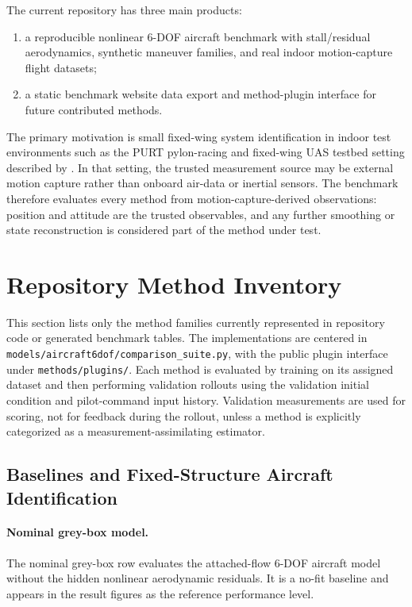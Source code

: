 \documentclass[11pt]{article}
\begin{document}
The current repository has three main products:
\begin{enumerate}
    \item a reproducible nonlinear 6-DOF aircraft benchmark with stall/residual aerodynamics, synthetic maneuver families, and real indoor motion-capture flight datasets;
    \item a static benchmark website data export and method-plugin interface for future contributed methods.
\end{enumerate}

The primary motivation is small fixed-wing system identification in indoor test environments such as the PURT pylon-racing and fixed-wing UAS testbed setting described by \citet{sribunma2026indoor}. In that setting, the trusted measurement source may be external motion capture rather than onboard air-data or inertial sensors. The benchmark therefore evaluates every method from motion-capture-derived observations: position and attitude are the trusted observables, and any further smoothing or state reconstruction is considered part of the method under test.

\section{Repository Method Inventory}

This section lists only the method families currently represented in repository code or generated benchmark tables. The implementations are centered in \texttt{models/aircraft6dof/comparison\_suite.py}, with the public plugin interface under \texttt{methods/plugins/}. Each method is evaluated by training on its assigned dataset and then performing validation rollouts using the validation initial condition and pilot-command input history. Validation measurements are used for scoring, not for feedback during the rollout, unless a method is explicitly categorized as a measurement-assimilating estimator.

\subsection{Baselines and Fixed-Structure Aircraft Identification}

\paragraph{Nominal grey-box model.}
The nominal grey-box row evaluates the attached-flow 6-DOF aircraft model without the hidden nonlinear aerodynamic residuals. It is a no-fit baseline and appears in the result figures as the reference performance level.
\end{document}
